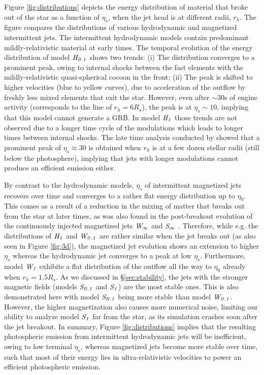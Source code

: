 \documentclass[fleqn,usenatbib]{mnras}
\newcommand{\Ha}{{\it H_{0.1}}}
\newcommand{\Hb}{{\it H_{1}}}
\newcommand{\Wa}{{\it W_{0.1}}}
\newcommand{\Wb}{{\it W_{1}}}
\newcommand{\Sa}{{\it S_{0.1}}}
\newcommand{\Sb}{{\it S_{1}}}
\newcommand{\Wc}{{\it W_{\infty}}}
\newcommand{\Sc}{{\it S_{\infty}}}
\begin{document}
	Figure \ref{fig:distributions} depicts the energy distribution of material that broke out of the star as a function of $ \eta_s $, when the jet head is at different radii, $ r_h $. The figure compares the distributions of various hydrodynamic and magnetized intermittent jets.
	The intermittent hydrodynamic models contain predominant mildly-relativistic material at early times. The temporal evolution of the energy distribution of model $ \Ha $ shows two trends: (i) The distribution converges to a prominent peak, owing to internal shocks between the fast elements with the mildly-relativistic quasi-spherical cocoon in the front; (ii) The peak is shifted to higher velocities (blue to yellow curves), due to acceleration of the outflow by freshly less mixed elements that exit the star. However, even after $ \sim 30 $s of engine activity (corresponds to the line of $ r_h = 6R_\star $), the peak is at $ \eta_s \sim 10 $, implying that this model cannot generate a GRB.
	In model $ \Hb $ those trends are not observed due to a longer time cycle of the modulations which leads to longer times between internal shocks. The late time analysis conducted by \citet{Gottlieb2019} showed that a prominent peak of $ \eta_s \approx 30 $ is obtained when $ r_h $ is at a few dozen stellar radii (still below the photosphere), implying that jets with longer modulations cannot produce an efficient emission either.
	
	By contrast to the hydrodynamic models, $ \eta_s $ of intermittent magnetized jets recovers over time and converges to a rather flat energy distribution up to $ \eta_0 $. This comes as a result of a reduction in the mixing of matter that breaks out from the star at later times, as was also found in the post-breakout evolution of the continuously injected magnetized jets $ \Wc $ and $ \Sc $ \citep{Gottlieb2020b}.
	Therefore, while e.g. the distributions of $ \Hb $ and $ \Wa $ are rather similar when the jet breaks out (as also seen in Figure \ref{fig:3d}), the magnetized jet evolution shows an extension to higher $ \eta_s $ whereas the hydrodynamic jet converges to a peak at low $ \eta_s $.
	Furthermore, model $ \Wb $ exhibits a flat distribution of the outflow all the way to $ \eta_0 $ already when $ r_h = 1.5R_\star $.
	As we discussed in \S\ref{sec:stability}, the jets with the stronger magnetic fields (models $ \Sa $ and $ \Sb $) are the most stable ones.
	This is also demonstrated here with model $ \Sa $ being more stable than model $ \Wa $.
	However, the higher magnetization also causes more numerical noise, limiting our ability to analyze model $ \Sb $ far from the star, as its simulation crashes soon after the jet breakout.
	In summary, Figure \ref{fig:distributions} implies that the resulting photospheric emission from intermittent hydrodynamic jets will be inefficient, owing to low terminal $ \eta_s $, whereas magnetized jets become more stable over time, such that most of their energy lies in ultra-relativistic velocities to power an efficient photospheric emission.
	
\end{document}
